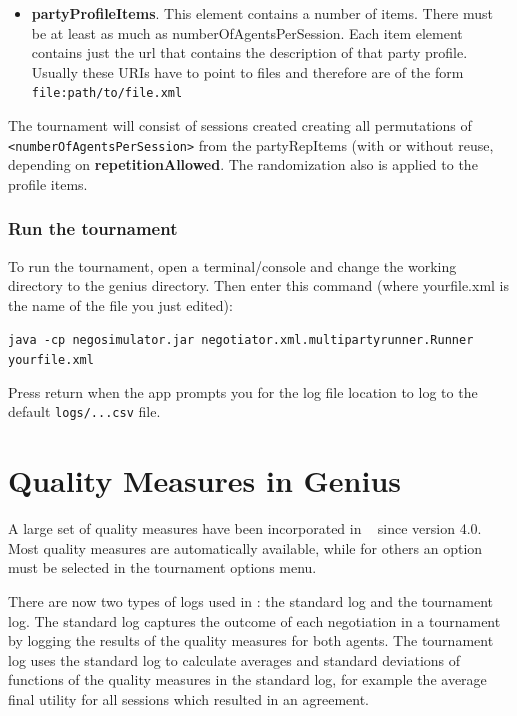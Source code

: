 \documentclass[]{article}
\begin{document}
\begin{itemize}
    \item \textbf{partyProfileItems}. This element contains a number of items. There must be at least as much as numberOfAgentsPerSession. Each item element contains just the url that contains the description of that party profile. Usually these URIs have to point to files and therefore are of the form \verb|file:path/to/file.xml|
\end{itemize}

The tournament will consist of sessions created creating all permutations of \verb|<numberOfAgentsPerSession>| from the partyRepItems (with or without reuse, depending on \textbf{repetitionAllowed}. The randomization also is applied to the profile items.


\subsubsection{Run the tournament}
To run the tournament, open a terminal/console and change the working directory to the genius directory.
Then enter this command (where yourfile.xml is the name of the file you just edited):

\vspace{0.5cm}
\verb|java -cp negosimulator.jar negotiator.xml.multipartyrunner.Runner yourfile.xml|
\vspace{0.5cm}

Press return when the app prompts you for the log file location to log to  the default \verb|logs/...csv| file.

\section{Quality Measures in Genius}\label{sec:qm}
A large set of quality measures have been incorporated in \Genius~ since version 4.0. Most quality measures are automatically available, while for others an option must be selected in the tournament options menu.

There are now two types of logs used in \Genius: the standard log and the tournament log. The standard log captures the outcome of each negotiation in a tournament by logging the results of the quality measures for both agents. The tournament log uses the standard log to calculate averages and standard deviations of functions of the quality measures in the standard log, for example the average final utility for all sessions which resulted in an agreement.
\end{document}

